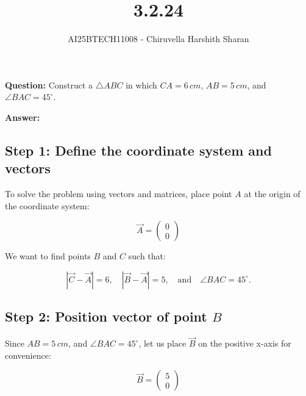 \documentclass[journal]{IEEEtran}
\begin{document}

\vspace{3cm}

\title{3.2.24}
\author{AI25BTECH11008 - Chiruvella Harshith Sharan}
{\let\newpage\relax\maketitle}

\renewcommand{\thefigure}{\theenumi}
\renewcommand{\thetable}{\theenumi}
\setlength{\intextsep}{10pt} %


\renewcommand{\thetable}{\theenumi}


\textbf{Question:}
Construct a $\triangle ABC$ in which $CA = 6\,cm$, $AB = 5\,cm$, and $\angle BAC = 45^\circ$.
\vspace{0.3cm}

\textbf{Answer:}

\subsection*{\textbf{Step} 1: Define the coordinate system and vectors}

To solve the problem using vectors and matrices, place point $A$ at the origin of the coordinate system:

\[
\vec{A} = \begin{pmatrix}0 \\ 0\end{pmatrix}
\]

We want to find points $B$ and $C$ such that:

\[
|\vec{C} - \vec{A}| = 6, \quad |\vec{B} - \vec{A}| = 5, \quad \text{and} \quad \angle BAC = 45^\circ.
\]

\subsection*{\textbf{Step} 2: Position vector of point $B$}

Since $AB = 5\,cm$, and $\angle BAC = 45^\circ$, let us place $\vec{B}$ on the positive x-axis for convenience:

\[
\vec{B} = \begin{pmatrix}5 \\ 0\end{pmatrix}
\]
\end{document}
